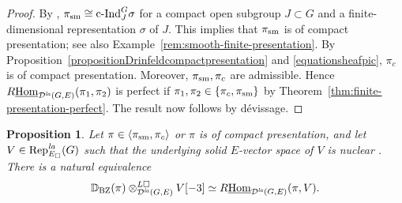\documentclass[a4paper,10pt]{amsart}
\theoremstyle{remark}
\theoremstyle{definition}
\theoremstyle{plain}
\newtheorem{proposition}[theorem]{Proposition}
\numberwithin{equation}{section}
\newcommand{\bbD}{{\mathbb D}}
\newcommand{\calD}{{\mathcal D}}
\newcommand{\Hom}{{\rm Hom}}
\newcommand{\uHom}{\underline{\Hom}}
\newcommand{\la}{{\it la}}
\newcommand{\Rep}{{\rm Rep}}
\newcommand{\sm}{{\rm sm}}
\newcommand{\cInd}{\mathrm{c\text{-}Ind}}
\newcommand{\BZ}{\ensuremath{\mathrm{BZ}}}
\begin{document}
\begin{proof}
By \cite[\S15.5]{bushnellHenniart2006}, $\pi_{\sm}\cong\cInd_J^{G}\sigma$ for a compact open subgroup $J\subset G$ and a finite-dimensional representation $\sigma$ of $J$. This implies that $\pi_{\sm}$ is of compact presentation; see also Example~\ref{rem:smooth-finite-presentation}. By Proposition~\ref{propositionDrinfeldcompactpresentation} and \eqref{equationsheafpic}, $\pi_c$ is of compact presentation. Moreover, $\pi_{\sm},\pi_c$ are admissible. Hence $R\uHom_{\calD^{\la}(G,E)}(\pi_1,\pi_2)$ is perfect if $\pi_1,\pi_2\in\{\pi_c,\pi_{\sm}\}$ by Theorem~\ref{thm:finite-presentation-perfect}. The result now follows by d\'evissage.
\end{proof}

\begin{proposition}\label{prop:BZ-tensor-Hom}
Let $\pi\in\langle \pi_{\sm},\pi_c\rangle$ or $\pi$ is of compact presentation, and let $V\in\Rep^{\la}_{E_\square}(G)$ such that the underlying solid $E$-vector space of $V$ is nuclear \cite[Def.~A.10]{bosco2023rationalpadicHodge}. There is a natural equivalence
\[
 \bbD_{\BZ}(\pi)\otimes^{L\square}_{\calD^{\la}(G,E)}V[-3]\simeq R\uHom_{\calD^{\la}(G,E)}(\pi,V).
\]
\end{proposition}
\end{document}
